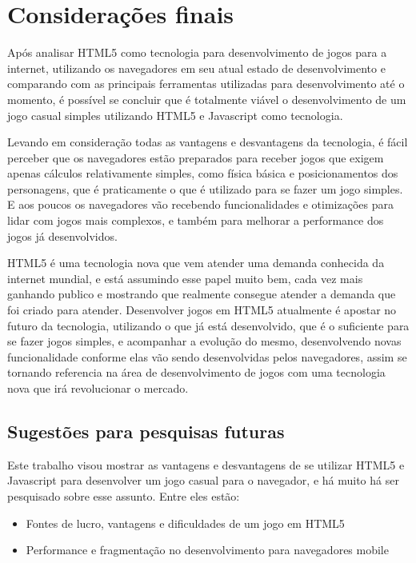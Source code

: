 \section{Considerações finais}

Após analisar HTML5 como tecnologia para desenvolvimento de jogos para
a internet, utilizando os navegadores em seu atual estado de
desenvolvimento e comparando com as principais ferramentas utilizadas
para desenvolvimento até o momento, é possível se concluir que é
totalmente viável o desenvolvimento de um jogo casual simples
utilizando HTML5 e Javascript como tecnologia.

Levando em consideração todas as vantagens e desvantagens da
tecnologia, é fácil perceber que os navegadores estão preparados para
receber jogos que exigem apenas cálculos relativamente
simples, como física básica e posicionamentos dos personagens, que é
praticamente o que é utilizado para se fazer um jogo simples. E aos
poucos os navegadores vão recebendo funcionalidades e otimizações para
lidar com jogos mais complexos, e também para melhorar a performance
dos jogos já desenvolvidos.

HTML5 é uma tecnologia nova que vem atender uma demanda conhecida da
internet mundial, e está assumindo esse papel muito bem, cada vez mais
ganhando publico e mostrando que realmente consegue atender a demanda
que foi criado para atender. Desenvolver jogos em HTML5 atualmente é
apostar no futuro da tecnologia, utilizando o que já está
desenvolvido, que é o suficiente para se fazer jogos simples, e
acompanhar a evolução do mesmo, desenvolvendo novas funcionalidade
conforme elas vão sendo desenvolvidas pelos navegadores, assim se
tornando referencia na área de desenvolvimento de jogos com uma
tecnologia nova que irá revolucionar o mercado.

\subsection{Sugestões para pesquisas futuras}

Este trabalho visou mostrar as vantagens e desvantagens de se utilizar
HTML5 e Javascript para desenvolver um jogo casual para o navegador,
e há muito há ser pesquisado sobre esse assunto. Entre eles
estão:

\begin{itemize}
    \item Fontes de lucro, vantagens e dificuldades de um jogo em HTML5
    \item Performance e fragmentação no desenvolvimento para navegadores mobile
\end{itemize}
